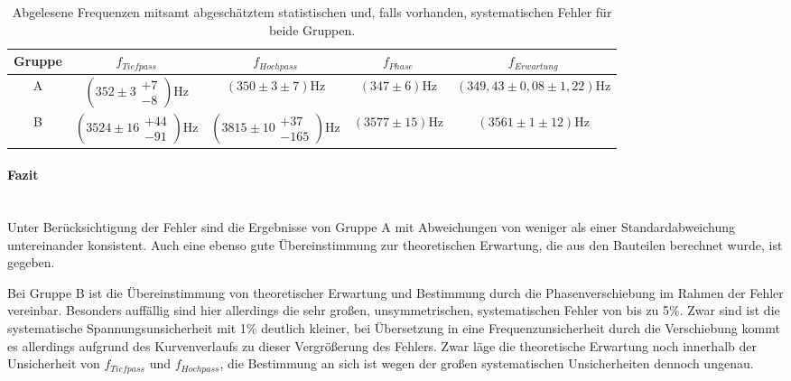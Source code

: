 \documentclass[12pt,a4paper]{article}
\begin{document}
\begin{table}
\centering
\begin{tabular}{|c|c|c|c|c|}
\hline
Gruppe & $f_{Tiefpass}$ & $f_{Hochpass}$ & $f_{Phase}$ &  $f_{Erwartung}$ \\
\hline
A & $(352 \pm 3 \substack{+7\\-8})$Hz & $(350 \pm 3 \pm 7)$Hz & $(347 \pm 6)$Hz & $(349,43 \pm 0,08 \pm 1,22)$Hz \\
\hline
B & $(3524 \pm 16 \substack{+44 \\ -91})$Hz & $(3815 \pm 10 \substack{+37 \\ -165})$Hz & $(3577 \pm 15)$Hz & $(3561 \pm 1 \pm 12)$Hz \\
\hline
\end{tabular}
\caption{Abgelesene Frequenzen mitsamt abgeschätztem statistischen und, falls vorhanden, systematischen Fehler für beide Gruppen.}
\label{tab:HochTief}
\end{table}

\paragraph{Fazit} \mbox{}\\
Unter Berücksichtigung der Fehler sind die Ergebnisse von Gruppe A mit Abweichungen von weniger als einer Standardabweichung untereinander konsistent. Auch eine ebenso gute Übereinstimmung zur theoretischen Erwartung, die aus den Bauteilen berechnet wurde, ist gegeben.

Bei Gruppe B ist die Übereinstimmung von theoretischer Erwartung und Bestimmung durch die Phasenverschiebung im Rahmen der Fehler vereinbar. Besonders auffällig sind hier allerdings die sehr großen, unsymmetrischen, systematischen Fehler von bis zu 5\%. Zwar sind ist die systematische Spannungsunsicherheit mit 1\% deutlich kleiner, bei Übersetzung in eine Frequenzunsicherheit durch die Verschiebung kommt es allerdings aufgrund des Kurvenverlaufs zu dieser Vergrößerung des Fehlers. Zwar läge die theoretische Erwartung noch innerhalb der Unsicherheit von $f_{Tiefpass}$ und $f_{Hochpass}$, die Bestimmung an sich ist wegen der großen systematischen Unsicherheiten dennoch ungenau.
\end{document}
